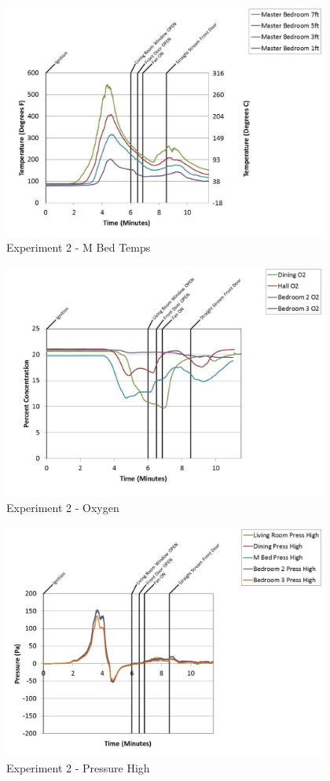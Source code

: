 \documentclass{article}
\begin{document}
\begin{appendices}
	\begin{figure}[h!]
		\centering
		\includegraphics[height=3.05in]{0_Images/Results_Charts/Exp_2_Charts/MBedTemps.pdf}
		\caption{Experiment 2 - M Bed Temps}
	\end{figure}
 
	\clearpage

	\begin{figure}[h!]
		\centering
		\includegraphics[height=3.05in]{0_Images/Results_Charts/Exp_2_Charts/Oxygen.pdf}
		\caption{Experiment 2 - Oxygen}
	\end{figure}
 

	\begin{figure}[h!]
		\centering
		\includegraphics[height=3.05in]{0_Images/Results_Charts/Exp_2_Charts/PressureHigh.pdf}
		\caption{Experiment 2 - Pressure High}
	\end{figure}
 

\end{appendices}
\end{document}
